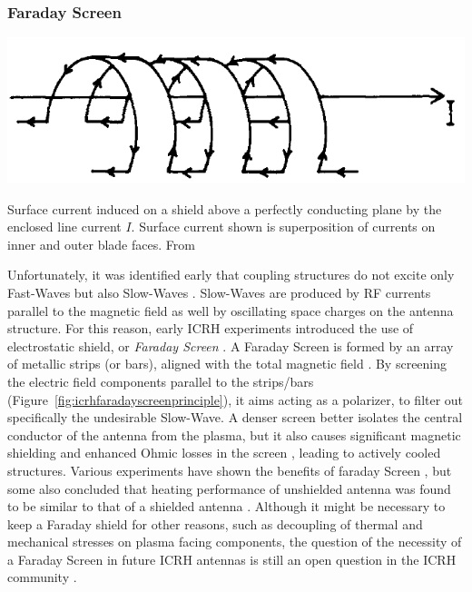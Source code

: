 
\subsubsection{Faraday Screen}
\begin{marginfigure}
	\centering
	\includegraphics[width=1.0\linewidth]{figures/chap3/WEST_ICRH/ICRH_Faraday_Screen_Principle}
	\caption{Surface current induced on a shield above a perfectly conducting plane by the enclosed line current $I$. Surface current shown is superposition of currents on inner and outer blade faces. From \cite{faulconer1983}}
	\label{fig:icrhfaradayscreenprinciple}
\end{marginfigure}

Unfortunately, it was identified early that coupling structures do not excite only Fast-Waves but also Slow-Waves . Slow-Waves are produced by RF currents parallel to the magnetic field as well by oscillating space charges on the antenna structure. For this reason, early ICRH experiments introduced the use of electrostatic shield, or \textit{Faraday Screen} . A Faraday Screen is formed by an array of metallic strips (or bars), aligned with the total magnetic field . By screening the electric field components parallel to the strips/bars (Figure~\ref{fig:icrhfaradayscreenprinciple}), it aims acting as a polarizer, to filter out specifically the undesirable Slow-Wave. A denser screen better isolates the central conductor of the antenna from the plasma, but it also causes significant magnetic shielding and enhanced Ohmic losses in the screen , leading to actively cooled structures. Various experiments have shown the benefits of faraday Screen , but some also concluded that heating performance of unshielded antenna was found to be similar to that of a shielded antenna .  Although it might be necessary to keep a Faraday shield for other reasons, such as decoupling of thermal and mechanical stresses on plasma facing components, the question of the necessity of a Faraday Screen in future ICRH antennas is still an open question in the ICRH community . 




